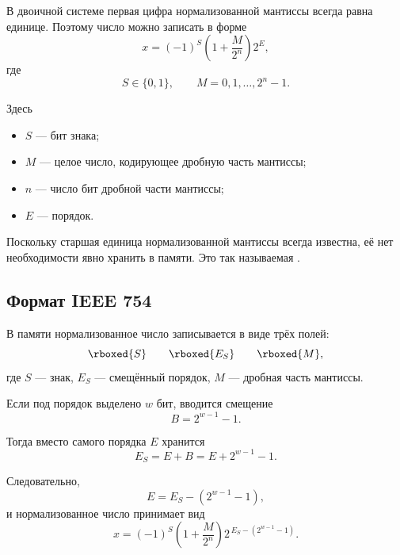 \documentclass[../final.tex]{subfiles}
\begin{document}
В двоичной системе первая цифра нормализованной мантиссы всегда
равна единице. Поэтому число можно записать в форме
%
\begin{equation*}
    x
    =
    (-1)^S
    \left(
        1+\frac{M}{2^n}
    \right)
    2^E,
\end{equation*}
%
где
%
\[
    S\in\{0,1\},
    \qquad
    M=0,1,\ldots,2^n-1.
\]

Здесь

\begin{itemize}
    \item $S$ --- бит знака;
    \item $M$ --- целое число, кодирующее дробную часть мантиссы;
    \item $n$ --- число бит дробной части мантиссы;
    \item $E$ --- порядок.
\end{itemize}

Поскольку старшая единица нормализованной мантиссы всегда известна,
её нет необходимости явно хранить в памяти. Это так называемая
.


\subsection{Формат IEEE 754}

В памяти нормализованное число записывается в виде трёх полей:
%
\[
    \rboxed{S}
    \qquad
    \rboxed{E_S}
    \qquad
    \rboxed{M},
\]
%
где $S$ --- знак, $E_S$ --- смещённый порядок, $M$ --- дробная
часть мантиссы.

Если под порядок выделено $w$ бит, вводится смещение
%
\begin{equation*}
    B
    =
    2^{w-1}-1.
\end{equation*}

Тогда вместо самого порядка $E$ хранится
%
\begin{equation*}
    E_S
    =
    E+B
    =
    E+2^{w-1}-1.
\end{equation*}

Следовательно,
%
\begin{equation*}
    E
    =
    E_S-\left(2^{w-1}-1\right),
\end{equation*}
%
и нормализованное число принимает вид
%
\begin{equation*}
    x
    =
    (-1)^S
    \left(
        1+\frac{M}{2^n}
    \right)
    2^{\,E_S-(2^{w-1}-1)}.
\end{equation*}
\end{document}
